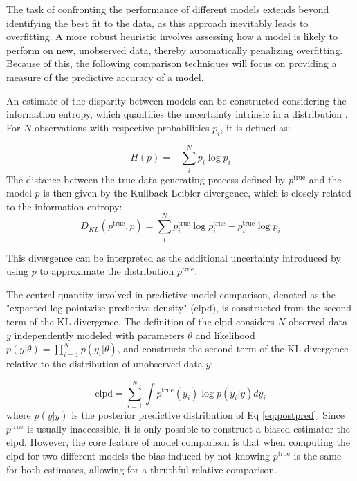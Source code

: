 The task of confronting the performance of different
models extends beyond identifying the best fit to the data, as this approach inevitably leads to overfitting. A
more robust heuristic involves assessing how a model is likely to perform on new, unobserved data, thereby automatically
penalizing overfitting. Because of this, the following comparison techniques will focus on providing a measure of the
predictive accuracy of a model.

An estimate of the disparity between models can be constructed considering the information entropy, which quantifies the
uncertainty intrinsic in a distribution \cite{mcelreath2020statistical}. For $N$ observations with respective probabilities  $p_i$, it is defined as:

\begin{equation}
    H(p)=-\sum_i^N p_i \log p_i
\end{equation}
The distance between the true data generating process defined by $p^{\text{true}}$ and the model  $p$ is then given by
the Kullback-Leibler divergence, which is closely related to the information entropy:
\begin{equation}
    D_{KL}(p^{\text{true}}, p) = \sum_i^N p_i^{\text{true}}\log p^{\text{true}}_i - p^{\text{true}}_i\log p_i
\end{equation}


This divergence can be interpreted as the additional uncertainty introduced by using $p$ to approximate
the distribution $p^{\text{true}}$. 


The central quantity involved in predictive model comparison, denoted as the "expected log pointwise predictive density" (elpd), is
constructed from the second term of the KL divergence.
The definition of the elpd considers $N$ observed data $y$ independently modeled with parameters $\theta$ and
likelihood $p(y|\theta) = \prod_{i=1}^{N} p(y_i|\theta)$, and constructs the second term of the KL divergence relative
to the distribution of unobserved data $\tilde{y}$:

\begin{equation}
\text{elpd} = \sum_{i=1}^{N}\int p^{\text{true}}(\tilde{y_i}) \log p(\tilde{y_i}|y) d\tilde{y_i}
\end{equation}
where $p(\tilde{y}|y)$ is the posterior predictive distribution of Eq \ref{eq:postpred}. Since $p^{\text{true}}$ is
usually inaccessible, it is only possible to construct a biased estimator the elpd. However, the core feature of model
comparison is that when computing the elpd for two different models the bias induced by not knowing $p^\text{true}$
is the same for both estimates, allowing for a thruthful relative comparison. 

